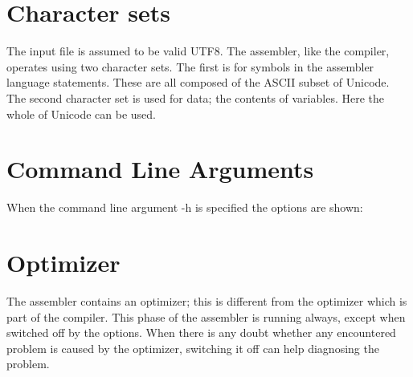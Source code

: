 \section{Character sets}
The input file is assumed to be valid UTF8.
The assembler, like the compiler, operates using two character
sets. The first is for symbols in the assembler language
statements. These are all composed of the ASCII subset of Unicode. The
second character set is used for data; the contents of
variables. Here the whole of Unicode can be used.

\section{Command Line Arguments}
When the command line argument -h is specified the options are shown:\\
\begin{shaded}
  \small
  \obeylines {}
 \end{shaded}

\section{Optimizer}
The assembler contains an optimizer; this is different from the
optimizer which is part of the compiler. This phase of the assembler
is running always, except when switched off by the 
options. When there is any doubt whether any encountered problem is
caused by the optimizer, switching it off can help diagnosing the problem.

